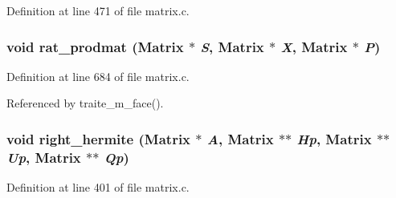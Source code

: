Definition at line 471 of file matrix.c.
\subsubsection{\setlength{\rightskip}{0pt plus 5cm}void rat\_\-prodmat (Matrix $\ast$ {\em S}, Matrix $\ast$ {\em X}, Matrix $\ast$ {\em P})}\label{matrix_8c_a9}




Definition at line 684 of file matrix.c.

Referenced by traite\_\-m\_\-face().

\subsubsection{\setlength{\rightskip}{0pt plus 5cm}void right\_\-hermite (Matrix $\ast$ {\em A}, Matrix $\ast$$\ast$ {\em Hp}, Matrix $\ast$$\ast$ {\em Up}, Matrix $\ast$$\ast$ {\em Qp})}\label{matrix_8c_a6}




Definition at line 401 of file matrix.c.
